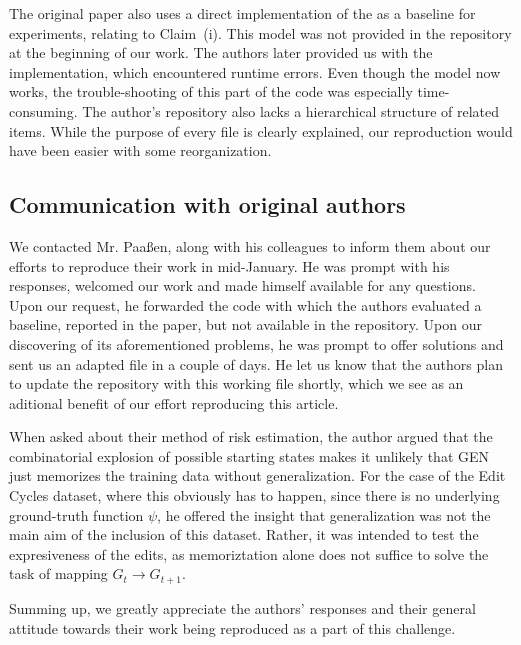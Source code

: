 The original paper also uses a direct implementation of the \cite{VGRNN} as a baseline for experiments, relating to \mbox{Claim (i).} This model was not provided in the repository at the beginning of our work. The authors later provided us with the implementation, which encountered runtime errors. Even though the model now works, the trouble-shooting of this part of the code was especially time-consuming. The author's repository also lacks a hierarchical structure of related items. While the purpose of every file is clearly explained, our reproduction would have been easier with some reorganization.



\subsection{Communication with original authors}

We contacted Mr. Paaßen, along with his colleagues to inform them about our efforts to reproduce their work in mid-January. He was prompt with his responses, welcomed our work and made himself available for any questions. Upon our request, he forwarded the code with which the authors evaluated a baseline, reported in the paper, but not available in the repository. Upon our discovering of its aforementioned problems, he was prompt to offer solutions and sent us an adapted file in a couple of days. He let us know that the authors plan to update the repository with this working file shortly, which we see as an aditional benefit of our effort reproducing this article.

When asked about their method of risk estimation, the author argued that the combinatorial explosion of possible starting states makes it unlikely that GEN just memorizes the training data without generalization. For the case of the Edit Cycles dataset, where this obviously has to happen, since there is no underlying ground-truth function $\psi$, he offered the insight that generalization was not the main aim of the inclusion of this dataset. Rather, it was intended to test the expresiveness of the edits, as memoriztation alone does not suffice to solve the task of mapping $G_{t} \to G_{t+1}$.

Summing up, we greatly appreciate the authors' responses and their general attitude towards their work being reproduced as a part of this challenge.
